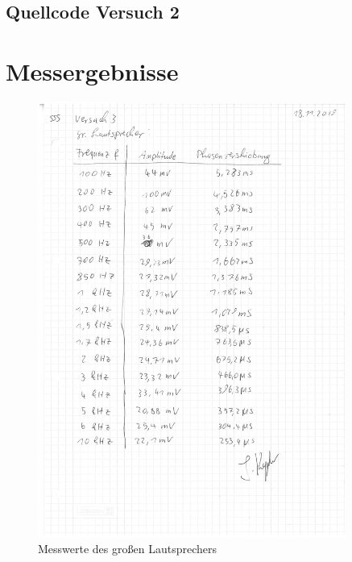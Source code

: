 \documentclass[12pt, oneside, a4paper, \docLanguage]{report}
\begin{document}
\subsection{Quellcode Versuch 2}
\label{chap:APPENDIX_SOURCECODE_V2}



\section{Messergebnisse}
\label{chap:APPENDIX_MEASUREMENT_SOURCE}
\begin{normalsize}
\begin{figure}[H]
\includegraphics[width=0.9\textwidth]{../MeasurementBigSpeaker.png}
\caption{Messwerte des großen Lautsprechers}
\end{figure}
\begin{figure}[H]

\end{figure}
\end{normalsize}
\end{document}
